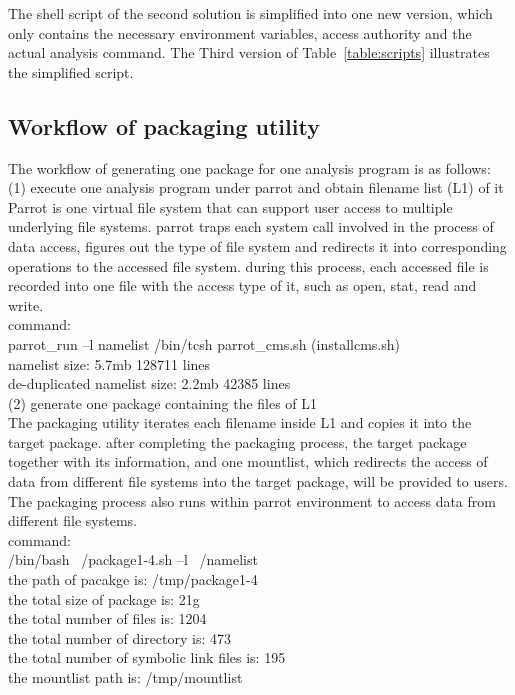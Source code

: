 \documentclass{article}
\begin{document}
The shell script of the second solution is simplified into one new version, which only contains the necessary environment variables, access authority and the actual analysis command. The Third version of Table~\ref{table:scripts} illustrates the simplified script.

\subsection{Workflow of packaging utility}
\indent The workflow of generating one package for one analysis program  is as follows: \\
\indent (1) execute one analysis program under parrot and obtain filename list (L1) of it\\
\indent Parrot is one virtual file system that can support user access to multiple underlying file systems. parrot traps each system call involved in the process of data access, figures out the type of file system and redirects it into corresponding operations to the accessed file system. during this process, each accessed file is recorded into one file with the access type of it, such as open, stat, read and write.\\
\indent command:\\
\indent parrot\_run –l namelist /bin/tcsh parrot\_cms.sh (installcms.sh)\\
\indent namelist size: 5.7mb     128711 lines\\
\indent de-duplicated namelist size: 2.2mb   42385 lines\\

(2) generate one package containing the files of L1 \\
\indent The packaging utility iterates each filename inside L1 and copies it into the target package. after completing the packaging process, the target package together with its information, and one mountlist, which redirects the access of data from different file systems into the target package, will be provided to users.\\

The packaging process also runs within parrot environment to access data from different file systems.\\
\indent command:\\
\indent /bin/bash ~/package1-4.sh –l ~/namelist\\
\indent the path of pacakge is: /tmp/package1-4\\
\indent the total size of package is: 21g\\
\indent the total number of files is: 1204\\
\indent the total number of directory is: 473\\
\indent the total number of symbolic link files is: 195\\
\indent the mountlist path is: /tmp/mountlist\\
\end{document}
